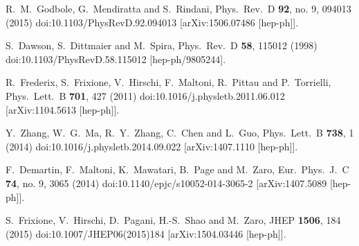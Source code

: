 \documentclass[twocolumn,prd,noshowpacs,nofootinbib,amsmath,amssymb,superscriptaddress,preprintnumbers]{revtex4}
\begin{document}
\begin{thebibliography}{99}
  R.~M.~Godbole, G.~Mendiratta and S.~Rindani,
  Phys.\ Rev.\ D {\bf 92}, no. 9, 094013 (2015)
  doi:10.1103/PhysRevD.92.094013
  [arXiv:1506.07486 [hep-ph]].

  S.~Dawson, S.~Dittmaier and M.~Spira,
  Phys.\ Rev.\ D {\bf 58}, 115012 (1998)
  doi:10.1103/PhysRevD.58.115012
  [hep-ph/9805244].


  R.~Frederix, S.~Frixione, V.~Hirschi, F.~Maltoni, R.~Pittau and P.~Torrielli,
  Phys.\ Lett.\ B {\bf 701}, 427 (2011)
  doi:10.1016/j.physletb.2011.06.012
  [arXiv:1104.5613 [hep-ph]].

  Y.~Zhang, W.~G.~Ma, R.~Y.~Zhang, C.~Chen and L.~Guo,
  Phys.\ Lett.\ B {\bf 738}, 1 (2014)
  doi:10.1016/j.physletb.2014.09.022
  [arXiv:1407.1110 [hep-ph]].

  F.~Demartin, F.~Maltoni, K.~Mawatari, B.~Page and M.~Zaro,
  Eur.\ Phys.\ J.\ C {\bf 74}, no. 9, 3065 (2014)
  doi:10.1140/epjc/s10052-014-3065-2
  [arXiv:1407.5089 [hep-ph]].


  S.~Frixione, V.~Hirschi, D.~Pagani, H.-S.~Shao and M.~Zaro,
  JHEP {\bf 1506}, 184 (2015)
  doi:10.1007/JHEP06(2015)184
  [arXiv:1504.03446 [hep-ph]].


\end{thebibliography}
\end{document}
